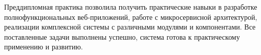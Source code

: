 
Преддипломная практика позволила получить практические навыки в разработке полнофункциональных веб-приложений, работе с микросервисной архитектурой, реализации комплексной системы с различными модулями и компонентами. Все поставленные задачи выполнены успешно, система готова к практическому применению и развитию.

